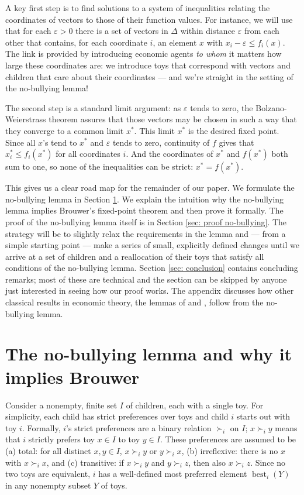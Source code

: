 \documentclass[english, 11pt]{article}
\theoremstyle{plain} %
\theoremstyle{definition}
\DeclareMathOperator{\best}{best}
\begin{document}
A key first step is to find solutions to a system of inequalities relating the coordinates of vectors to those of their function values. For instance, we will use that for each $\varepsilon > 0$ there is a set of vectors in $\Delta$ within distance $\varepsilon$ from each other that contains, for each coordinate $i$, an element $x$ with $x_i - \varepsilon \leq f_i(x)$. The link is provided by introducing economic agents \emph{to whom\/} it matters how large these coordinates are: we introduce toys that correspond with vectors and children that care about their coordinates --- and we're straight in the setting of the no-bullying lemma!

The second step is a standard limit argument: as $\varepsilon$ tends to zero, the Bolzano-Weierstrass theorem assures that those vectors may be chosen in such a way that they converge to a common limit $x^*$. This limit $x^*$ is the desired fixed point. Since all $x$'s tend to $x^*$ and $\varepsilon$ tends to zero, continuity of $f$ gives that $x^*_i \leq f_i(x^*)$ for all coordinates $i$. And the coordinates of $x^*$ and $f(x^*)$ both sum to one, so none of the inequalities can be strict: $x^* = f(x^*)$.

This gives us a clear road map for the remainder of our paper. We formulate the no-bullying lemma in Section \ref{sec: no-bullying implies Brouwer}. We explain the intuition why the no-bullying lemma implies Brouwer's fixed-point theorem and then prove it formally. The proof of the no-bullying lemma itself is in Section \ref{sec: proof no-bullying}. The strategy will be to slightly relax the requirements in the lemma and --- from a simple starting point --- make a series of small, explicitly defined changes until we arrive at a set of children and a reallocation of their toys that satisfy all conditions of the no-bullying lemma. Section \ref{sec: conclusion} contains concluding remarks; most of these are technical and the section can be skipped by anyone just interested in seeing how our proof works. The appendix discusses how other classical results in economic theory, the lemmas of \citet*{KKM1929} and \citet{Sperner1928}, follow from the no-bullying lemma.

\section{The no-bullying lemma and why it implies Brouwer}\label{sec: no-bullying implies Brouwer}

Consider a nonempty, finite set $I$ of children, each with a single toy. For simplicity, each child has strict preferences over toys and child $i$ starts out with toy $i$. Formally, $i$'s strict preferences are a binary relation $\succ_i$ on $I$; $x \succ_i y$ means that $i$ strictly prefers toy $x \in I$ to toy $y \in I$. These preferences are assumed to be (a) total: for all distinct $x, y \in I$, $x \succ_i y$ or $y \succ_i x$, (b) irreflexive: there is no $x$ with $x \succ_i x$, and (c) transitive: if $x \succ_i y$ and $y \succ_i z$, then also $x \succ_i z$. Since no two toys are equivalent, $i$ has a well-defined most preferred element $\best_i(Y)$ in any nonempty subset $Y$ of toys.
\end{document}
